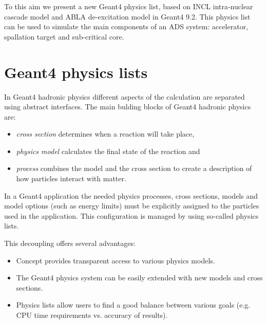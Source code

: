 \documentclass[a4paper]{jpconf}
\begin{document}
To this aim we present a new Geant4 physics list, 
based on INCL \cite{incl} intra-nuclear cascade model and ABLA de-excitation model \cite{abla, abla1, abla2} in Geant4 9.2. 
This physics list can be used to simulate the main components of an ADS system: accelerator, spallation
target and sub-critical core.



\section{Geant4 physics lists}\label{sec:list}

In Geant4 hadronic physics different aspects of the calculation are
separated using abstract interfaces. The main bulding blocks of Geant4
hadronic physics are:
\begin{itemize}
\item \emph{cross section} determines when a reaction will take place,
\item \emph{physics model} calculates the final state of the reaction and
\item \emph{process} combines the model and the cross section to
  create a description of how particles interact with matter.
\end{itemize}
In a Geant4 application the needed physics processes, cross sections,
models and model options (such as energy limits) must be explicitly
assigned to the particles used in the application. This configuration
is managed by using so-called physics lists.

This decoupling offers several advantages:
\begin{itemize}
\item Concept provides transparent access to various physics models.
\item The Geant4 physics system can be easily extended with new models and cross sections.
\item Physics lists allow users to find a good balance between various goals 
(e.g. CPU time requirements vs. accuracy of results).
\end{itemize}
\end{document}
